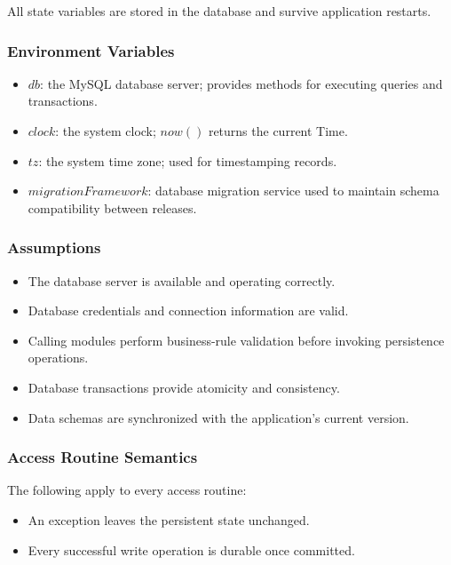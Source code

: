 \documentclass[12pt, titlepage]{article}
\begin{document}
All state variables are stored in the database and survive application restarts.

\subsubsection{Environment Variables}

\begin{itemize}
  \item $\mathit{db}$: the MySQL database server; provides methods for executing queries and transactions.
  \item $\mathit{clock}$: the system clock; $\mathit{now}()$ returns the current Time.
  \item $\mathit{tz}$: the system time zone; used for timestamping records.
  \item $\mathit{migrationFramework}$: database migration service used to maintain schema compatibility between releases.
\end{itemize}

\subsubsection{Assumptions}

\begin{itemize}
  \item The database server is available and operating correctly.
  \item Database credentials and connection information are valid.
  \item Calling modules perform business-rule validation before invoking persistence operations.
  \item Database transactions provide atomicity and consistency.
  \item Data schemas are synchronized with the application's current version.
\end{itemize}

\subsubsection{Access Routine Semantics}

The following apply to every access routine:

\begin{itemize}
  \item An exception leaves the persistent state unchanged.
  \item Every successful write operation is durable once committed.
\end{itemize}
\end{document}

